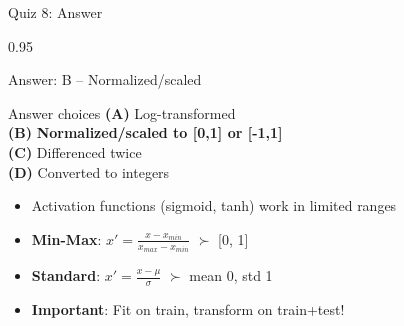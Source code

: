\documentclass[9pt, aspectratio=169, t]{beamer}
\begin{document}
\begin{frame}{Quiz 8: Answer}
    \begin{cminipage}{0.95\textwidth}
    {\small
    \begin{exampleblock}{Answer: B -- Normalized/scaled}
    \begin{block}{Answer choices}
        \textcolor{MainBlue}{\textbf{(A)}} Log-transformed \incorrect\\[2pt]
        \textcolor{MainBlue}{\textbf{(B)}} \textbf{\textcolor{Forest}{Normalized/scaled to [0,1] or [-1,1]}} \correct\\[2pt]
        \textcolor{MainBlue}{\textbf{(C)}} Differenced twice \incorrect\\[2pt]
        \textcolor{MainBlue}{\textbf{(D)}} Converted to integers \incorrect
    \end{block}

        \vspace{0.1cm}

        \begin{itemize}\setlength{\itemsep}{0pt}
            \item Activation functions (sigmoid, tanh) work in limited ranges
            \item \textbf{Min-Max}: $x' = \frac{x - x_{min}}{x_{max} - x_{min}}$ $\succ$ [0, 1]
            \item \textbf{Standard}: $x' = \frac{x - \mu}{\sigma}$ $\succ$ mean 0, std 1
            \item \textbf{Important}: Fit on train, transform on train+test!
        \end{itemize}
    \end{exampleblock}
    }
    \end{cminipage}
\end{frame}
\end{document}
